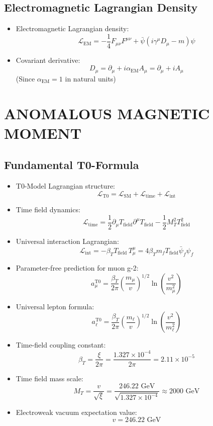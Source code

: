\documentclass[12pt,a4paper]{article}
\begin{document}
	\subsection{Electromagnetic Lagrangian Density}
	\begin{itemize}
		\item Electromagnetic Lagrangian density:
		\begin{equation}
			\mathcal{L}_{\text{EM}} = -\frac{1}{4}F_{\mu\nu}F^{\mu\nu} + \bar{\psi}(i\gamma^\mu D_\mu - m)\psi
		\end{equation}
		
		\item Covariant derivative:
		\begin{equation}
			D_\mu = \partial_\mu + i \alpha_{\text{EM}} A_\mu = \partial_\mu + i A_\mu
		\end{equation}
		(Since $\alpha_{\text{EM}} = 1$ in natural units)
	\end{itemize}
	
	\section{ANOMALOUS MAGNETIC MOMENT}

\subsection{Fundamental T0-Formula}
\begin{itemize}
	\item T0-Model Lagrangian structure:
	$$\mathcal{L}_{\text{T0}} = \mathcal{L}_{\text{SM}} + \mathcal{L}_{\text{time}} + \mathcal{L}_{\text{int}}$$
	
	\item Time field dynamics:
	$$\mathcal{L}_{\text{time}} = \frac{1}{2}\partial_\mu T_{\text{field}} \partial^\mu T_{\text{field}} - \frac{1}{2}M_T^2 T_{\text{field}}^2$$
	
	\item Universal interaction Lagrangian:
	$$\mathcal{L}_{\text{int}} = -\beta_T T_{\text{field}} \, T^\mu_\mu = 4\beta_T m_f T_{\text{field}} \bar{\psi}_f \psi_f$$
	
	\item Parameter-free prediction for muon g-2:
	$$\boxed{a_\mu^{\text{T0}} = \frac{\beta_T}{2\pi} \left(\frac{m_\mu}{v}\right)^{1/2} \ln\left(\frac{v^2}{m_\mu^2}\right)}$$
	
	\item Universal lepton formula:
	$$\boxed{a_\ell^{\text{T0}} = \frac{\beta_T}{2\pi} \left(\frac{m_\ell}{v}\right)^{1/2} \ln\left(\frac{v^2}{m_\ell^2}\right)}$$
	
	\item Time-field coupling constant:
	$$\beta_T = \frac{\xi}{2\pi} = \frac{1.327 \times 10^{-4}}{2\pi} = 2.11 \times 10^{-5}$$
	
	\item Time field mass scale:
	$$M_T = \frac{v}{\sqrt{\xi}} = \frac{246.22 \text{ GeV}}{\sqrt{1.327 \times 10^{-4}}} \approx 2000 \text{ GeV}$$
	
	\item Electroweak vacuum expectation value:
	$$v = 246.22 \text{ GeV}$$
\end{itemize}
\end{document}
